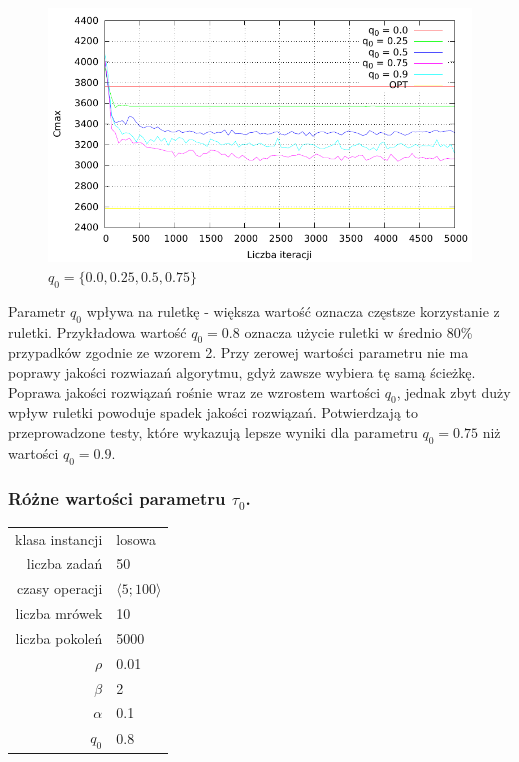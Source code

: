 \documentclass[10pt,a4paper]{article}
\begin{document}
\begin{figure}[h]
    \centering
    \includegraphics{./figures/inst_01_rnd_q0_smooth.pdf}
    \caption{$ q_0 = \{ 0.0, 0.25, 0.5, 0.75 \} $}
\end{figure}
\vspace{15mm}
Parametr $ q_0 $ wpływa na ruletkę - większa wartość oznacza częstsze korzystanie z ruletki.
Przykładowa wartość $ q_0 = 0.8 $ oznacza użycie ruletki w średnio 80\% przypadków zgodnie ze wzorem 2.
Przy zerowej wartości parametru nie ma poprawy jakości rozwiazań algorytmu, gdyż zawsze wybiera tę samą ścieżkę.
Poprawa jakości rozwiązań rośnie wraz ze wzrostem wartości $ q_0 $, jednak zbyt duży wpływ ruletki powoduje spadek jakości rozwiązań.
Potwierdzają to przeprowadzone testy, które wykazują lepsze wyniki dla parametru $ q_0 = 0.75 $ niż wartości $ q_0 = 0.9 $.

\newpage
\subsubsection{Różne wartości parametru $\tau_0$.}
\vspace{6 mm}
\begin{center}
\begin{tabular}{|r|l|}
  \hline
  klasa instancji & losowa \\
  liczba zadań & 50 \\
  czasy operacji & $ \langle 5;100 \rangle $  \\
  liczba mrówek & 10 \\
  liczba pokoleń & 5000 \\
  $ \rho $ & 0.01 \\
  $ \beta $ & 2 \\
  $ \alpha $ & 0.1 \\
  $ q_0 $ & 0.8 \\
  \hline
\end{tabular}
\end{center}
\end{document}
